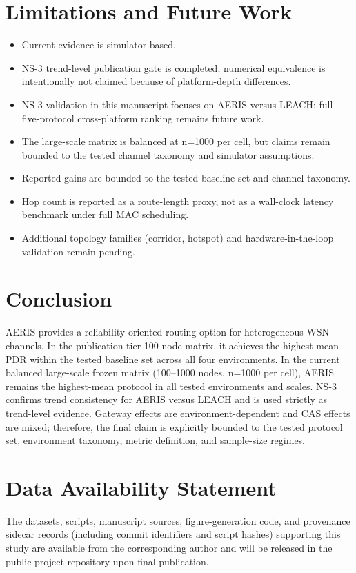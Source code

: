 \documentclass[sensors,article,submit,moreauthors,pdftex]{Definitions/mdpi}
\begin{document}
\section{Limitations and Future Work}
\begin{itemize}
\item Current evidence is simulator-based.
\item NS-3 trend-level publication gate is completed; numerical equivalence is intentionally not claimed because of platform-depth differences.
\item NS-3 validation in this manuscript focuses on AERIS versus LEACH; full five-protocol cross-platform ranking remains future work.
\item The large-scale matrix is balanced at n=1000 per cell, but claims remain bounded to the tested channel taxonomy and simulator assumptions.
\item Reported gains are bounded to the tested baseline set and channel taxonomy.
\item Hop count is reported as a route-length proxy, not as a wall-clock latency benchmark under full MAC scheduling.
\item Additional topology families (corridor, hotspot) and hardware-in-the-loop validation remain pending.
\end{itemize}

\section{Conclusion}
AERIS provides a reliability-oriented routing option for heterogeneous WSN channels. In the publication-tier 100-node matrix, it achieves the highest mean PDR within the tested baseline set across all four environments. In the current balanced large-scale frozen matrix (100--1000 nodes, n=1000 per cell), AERIS remains the highest-mean protocol in all tested environments and scales. NS-3 confirms trend consistency for AERIS versus LEACH and is used strictly as trend-level evidence. Gateway effects are environment-dependent and CAS effects are mixed; therefore, the final claim is explicitly bounded to the tested protocol set, environment taxonomy, metric definition, and sample-size regimes.

\section*{Data Availability Statement}
The datasets, scripts, manuscript sources, figure-generation code, and provenance sidecar records (including commit identifiers and script hashes) supporting this study are available from the corresponding author and will be released in the public project repository upon final publication.


\end{document}
